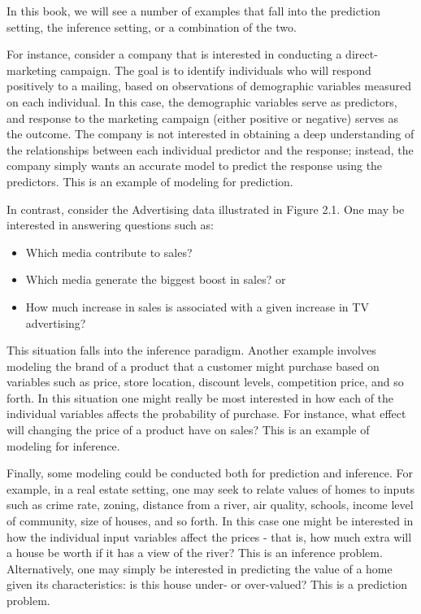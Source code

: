 \documentclass[10pt]{article}
\begin{document}
In this book, we will see a number of examples that fall into the prediction setting, the inference setting, or a combination of the two.

For instance, consider a company that is interested in conducting a direct-marketing campaign. The goal is to identify individuals who will respond positively to a mailing, based on observations of demographic variables measured on each individual. In this case, the demographic variables serve as predictors, and response to the marketing campaign (either positive or negative) serves as the outcome. The company is not interested in obtaining a deep understanding of the relationships between each individual predictor and the response; instead, the company simply wants an accurate model to predict the response using the predictors. This is an example of modeling for prediction.

In contrast, consider the Advertising data illustrated in Figure 2.1. One may be interested in answering questions such as:

\begin{itemize}
  \item Which media contribute to sales?
  \item Which media generate the biggest boost in sales? or
  \item How much increase in sales is associated with a given increase in TV advertising?
\end{itemize}

This situation falls into the inference paradigm. Another example involves modeling the brand of a product that a customer might purchase based on variables such as price, store location, discount levels, competition price, and so forth. In this situation one might really be most interested in how each of the individual variables affects the probability of purchase. For instance, what effect will changing the price of a product have on sales? This is an example of modeling for inference.

Finally, some modeling could be conducted both for prediction and inference. For example, in a real estate setting, one may seek to relate values of homes to inputs such as crime rate, zoning, distance from a river, air quality, schools, income level of community, size of houses, and so forth. In this case one might be interested in how the individual input variables affect the prices - that is, how much extra will a house be worth if it has a view of the river? This is an inference problem. Alternatively, one may simply be interested in predicting the value of a home given its characteristics: is this house under- or over-valued? This is a prediction problem.
\end{document}
